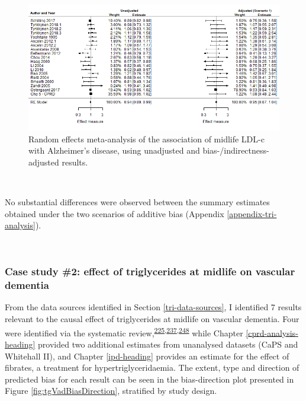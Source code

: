 \documentclass[a4paper, twoside]{templates/ociamthesis}
\begin{document}
\begin{figure}[H]
\includegraphics[width=1\linewidth]{figures/tri/fp_paired_midlife_ldl_ad} \caption[Random effects meta-analysis using unadjusted and bias-/indirectness-adjusted results.]{Random effects meta-analysis of the association of midlife LDL-c with Alzheimer's disease, using unadjusted and bias-/indirectness-adjusted results.}\label{fig:fpLdlAd}
\end{figure}

~

No substantial differences were observed between the summary estimates obtained under the two scenarios of additive bias (Appendix \ref{appendix-tri-analysis}).

~

\hypertarget{case-study-2-effect-of-triglycerides-at-midlife-on-vascular-dementia}{%
\subsubsection{Case study \#2: effect of triglycerides at midlife on vascular dementia}\label{case-study-2-effect-of-triglycerides-at-midlife-on-vascular-dementia}}

From the data sources identified in Section \ref{tri-data-sources}, I identified 7 results relevant to the causal effect of triglycerides at midlife on vascular dementia. Four were identified via the systematic review,\textsuperscript{\protect\hyperlink{ref-forti2010}{225},\protect\hyperlink{ref-raffaitin2009}{237},\protect\hyperlink{ref-yoshitake1995}{248}} while Chapter \ref{cprd-analysis-heading} provided two additional estimates from unanalysed datasets (CaPS and Whitehall II), and Chapter \ref{ipd-heading} provides an estimate for the effect of fibrates, a treatment for hypertriglyceridaemia. The extent, type and direction of predicted bias for each result can be seen in the bias-direction plot presented in Figure \ref{fig:tgVadBiasDirection}, stratified by study design.
\end{document}
